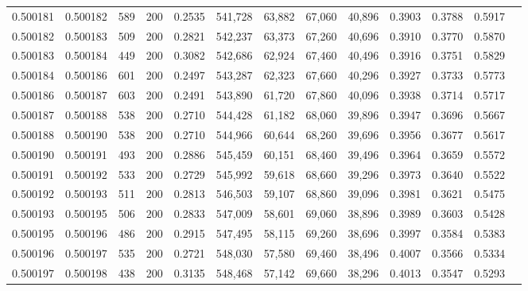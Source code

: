 \begin{tabular}{rrrrrrrrrrrrr}
0.500181 & 0.500182 &    589 & 200 &                                     0.2535 & 541,728 &  63,882 &  67,060 &  40,896 & 0.3903 & 0.3788 & 0.5917 \\
0.500182 & 0.500183 &    509 & 200 &                                     0.2821 & 542,237 &  63,373 &  67,260 &  40,696 & 0.3910 & 0.3770 & 0.5870 \\
0.500183 & 0.500184 &    449 & 200 &                                     0.3082 & 542,686 &  62,924 &  67,460 &  40,496 & 0.3916 & 0.3751 & 0.5829 \\
0.500184 & 0.500186 &    601 & 200 &                                     0.2497 & 543,287 &  62,323 &  67,660 &  40,296 & 0.3927 & 0.3733 & 0.5773 \\
0.500186 & 0.500187 &    603 & 200 &                                     0.2491 & 543,890 &  61,720 &  67,860 &  40,096 & 0.3938 & 0.3714 & 0.5717 \\
0.500187 & 0.500188 &    538 & 200 &                                     0.2710 & 544,428 &  61,182 &  68,060 &  39,896 & 0.3947 & 0.3696 & 0.5667 \\
0.500188 & 0.500190 &    538 & 200 &                                     0.2710 & 544,966 &  60,644 &  68,260 &  39,696 & 0.3956 & 0.3677 & 0.5617 \\
0.500190 & 0.500191 &    493 & 200 &                                     0.2886 & 545,459 &  60,151 &  68,460 &  39,496 & 0.3964 & 0.3659 & 0.5572 \\
0.500191 & 0.500192 &    533 & 200 &                                     0.2729 & 545,992 &  59,618 &  68,660 &  39,296 & 0.3973 & 0.3640 & 0.5522 \\
0.500192 & 0.500193 &    511 & 200 &                                     0.2813 & 546,503 &  59,107 &  68,860 &  39,096 & 0.3981 & 0.3621 & 0.5475 \\
0.500193 & 0.500195 &    506 & 200 &                                     0.2833 & 547,009 &  58,601 &  69,060 &  38,896 & 0.3989 & 0.3603 & 0.5428 \\
0.500195 & 0.500196 &    486 & 200 &                                     0.2915 & 547,495 &  58,115 &  69,260 &  38,696 & 0.3997 & 0.3584 & 0.5383 \\
0.500196 & 0.500197 &    535 & 200 &                                     0.2721 & 548,030 &  57,580 &  69,460 &  38,496 & 0.4007 & 0.3566 & 0.5334 \\
0.500197 & 0.500198 &    438 & 200 &                                     0.3135 & 548,468 &  57,142 &  69,660 &  38,296 & 0.4013 & 0.3547 & 0.5293 \\

\end{tabular}
